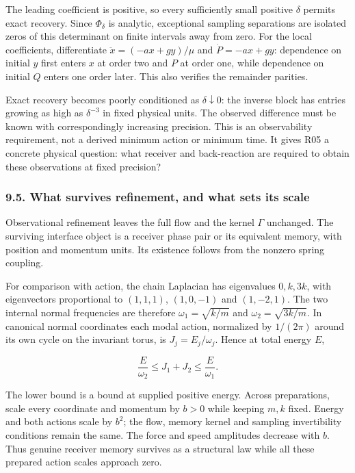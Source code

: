 \documentclass[11pt,a4paper]{article}
\begin{document}
The leading coefficient is positive, so every sufficiently small
positive \(\delta\) permits exact recovery. Since \(\Phi_\delta\) is
analytic, exceptional sampling separations are isolated zeros of this
determinant on finite intervals away from zero. For the local
coefficients, differentiate \(\ddot x=(-ax+gy)/\mu\) and
\(\dot P=-ax+gy\): dependence on initial \(y\) first enters \(x\) at
order two and \(P\) at order one, while dependence on initial \(Q\)
enters one order later. This also verifies the remainder parities.

Exact recovery becomes poorly conditioned as \(\delta\downarrow0\): the
inverse block has entries growing as high as \(\delta^{-3}\) in fixed
physical units. The observed difference must be known with
correspondingly increasing precision. This is an observability
requirement, not a derived minimum action or minimum time. It gives R05
a concrete physical question: what receiver and back-reaction are
required to obtain these observations at fixed precision?

\hypertarget{what-survives-refinement-and-what-sets-its-scale}{%
\subsubsection{9.5. What survives refinement, and what sets its
scale}\label{what-survives-refinement-and-what-sets-its-scale}}

Observational refinement leaves the full flow and the kernel \(\Gamma\)
unchanged. The surviving interface object is a receiver phase pair or
its equivalent memory, with position and momentum units. Its existence
follows from the nonzero spring coupling.

For comparison with action, the chain Laplacian has eigenvalues
\(0,k,3k\), with eigenvectors proportional to \((1,1,1)\), \((1,0,-1)\)
and \((1,-2,1)\). The two internal normal frequencies are therefore
\(\omega_1=\sqrt{k/m}\) and \(\omega_2=\sqrt{3k/m}\). In canonical
normal coordinates each modal action, normalized by \(1/(2\pi)\) around
its own cycle on the invariant torus, is \(J_j=E_j/\omega_j\). Hence at
total energy \(E\),

\[\frac E{\omega_2}\le J_1+J_2\le\frac E{\omega_1}.\]

The lower bound is a bound at supplied positive energy. Across
preparations, scale every coordinate and momentum by \(b>0\) while
keeping \(m,k\) fixed. Energy and both actions scale by \(b^2\); the
flow, memory kernel and sampling invertibility conditions remain the
same. The force and speed amplitudes decrease with \(b\). Thus genuine
receiver memory survives as a structural law while all these prepared
action scales approach zero.
\end{document}
